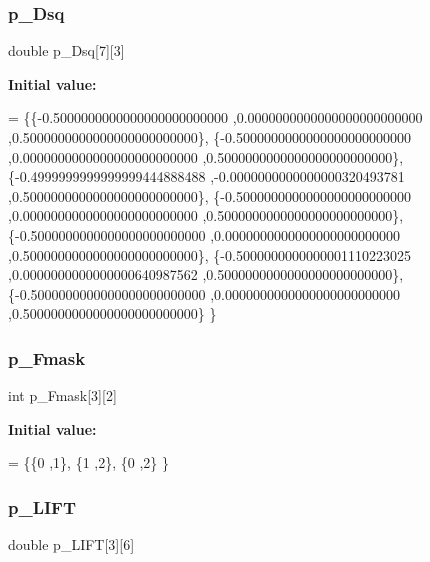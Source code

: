 \subsubsection{\texorpdfstring{p\+\_\+\+Dsq}{p\_Dsq}}
{\footnotesize\ttfamily double p\+\_\+\+Dsq\mbox{[}7\mbox{]}\mbox{[}3\mbox{]}}

{\bfseries Initial value\+:}
\begin{DoxyCode}
= \{\{-0.5000000000000000000000000 ,0.0000000000000000000000000 ,0.5000000000000000000000000\},
\{-0.5000000000000000000000000 ,0.0000000000000000000000000 ,0.5000000000000000000000000\},
\{-0.4999999999999999444888488 ,-0.0000000000000000320493781 ,0.5000000000000000000000000\},
\{-0.5000000000000000000000000 ,0.0000000000000000000000000 ,0.5000000000000000000000000\},
\{-0.5000000000000000000000000 ,0.0000000000000000000000000 ,0.5000000000000000000000000\},
\{-0.5000000000000001110223025 ,0.0000000000000000640987562 ,0.5000000000000000000000000\},
\{-0.5000000000000000000000000 ,0.0000000000000000000000000 ,0.5000000000000000000000000\}
\}
\end{DoxyCode}
\mbox{\label{a00987_a19c5c57b7dc71eb0fbdc015125cce46a}} 
\subsubsection{\texorpdfstring{p\+\_\+\+Fmask}{p\_Fmask}}
{\footnotesize\ttfamily int p\+\_\+\+Fmask\mbox{[}3\mbox{]}\mbox{[}2\mbox{]}}

{\bfseries Initial value\+:}
\begin{DoxyCode}
= \{\{0 ,1\},
\{1 ,2\},
\{0 ,2\}
\}
\end{DoxyCode}
\mbox{\label{a00987_a162ef160c01b03cd05791dc9a6acc934}} 
\subsubsection{\texorpdfstring{p\+\_\+\+L\+I\+FT}{p\_LIFT}}
{\footnotesize\ttfamily double p\+\_\+\+L\+I\+FT\mbox{[}3\mbox{]}\mbox{[}6\mbox{]}}

